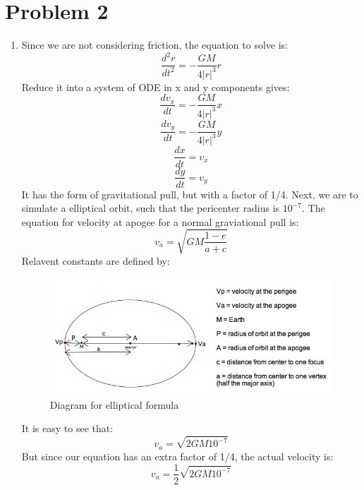 \documentclass[12pt,letterpaper]{article}
\begin{document}
\section*{Problem 2}
\begin{enumerate}
    \item
    Since we are not considering friction, the equation to solve is:
    \begin{equation}
        \frac{d^2r}{dt^2}=-\frac{GM}{4|r|^3}r
    \end{equation}
    Reduce it into a system of ODE in x and y components gives:
    \begin{equation}
        \frac{dv_x}{dt}=-\frac{GM}{4|r|^3}x
    \end{equation}
    \begin{equation}
        \frac{dv_y}{dt}=-\frac{GM}{4|r|^3}y
    \end{equation}
    \begin{equation}
        \frac{dx}{dt}=v_x
    \end{equation}
    \begin{equation}
        \frac{dy}{dt}=v_y
    \end{equation}    
    It has the form of gravitational pull, but with a factor of 1/4. Next, we are to simulate a elliptical orbit, such that the pericenter radius is  $10^{-7}$. The equation for velocity at apogee for a normal graviational pull is:
    \begin{equation}
        v_a=\sqrt{GM\frac{1-e}{a+c}}
    \end{equation}
    Relavent constants are defined by:
    \begin{figure}[h]
    \centering
    \includegraphics[width=1.\linewidth]{labeledellipse.jpg}
    \caption{Diagram for elliptical formula}
    \end{figure}
    \clearpage
    
    It is easy to see that:
    \begin{equation}
        v_a=\sqrt{2GM10^{-7}}
    \end{equation}
    But since our equation has an extra factor of 1/4, the actual velocity is:
    \begin{equation}
        v_a=\frac{1}{2}\sqrt{2GM10^{-7}}
    \end{equation}
    

\end{enumerate}
\end{document}
